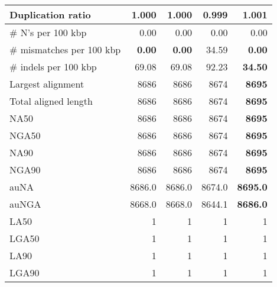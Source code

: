 \documentclass[12pt,a4paper]{article}
\begin{document}
\begin{table}[ht]
\begin{center}
\begin{tabular}{|l*{4}{|r}|}
Duplication ratio & 1.000 & 1.000 & {\bf 0.999} & 1.001 \\ \hline
\# N's per 100 kbp & 0.00 & 0.00 & 0.00 & 0.00 \\ \hline
\# mismatches per 100 kbp & {\bf 0.00} & {\bf 0.00} & 34.59 & {\bf 0.00} \\ \hline
\# indels per 100 kbp & 69.08 & 69.08 & 92.23 & {\bf 34.50} \\ \hline
Largest alignment & 8686 & 8686 & 8674 & {\bf 8695} \\ \hline
Total aligned length & 8686 & 8686 & 8674 & {\bf 8695} \\ \hline
NA50 & 8686 & 8686 & 8674 & {\bf 8695} \\ \hline
NGA50 & 8686 & 8686 & 8674 & {\bf 8695} \\ \hline
NA90 & 8686 & 8686 & 8674 & {\bf 8695} \\ \hline
NGA90 & 8686 & 8686 & 8674 & {\bf 8695} \\ \hline
auNA & 8686.0 & 8686.0 & 8674.0 & {\bf 8695.0} \\ \hline
auNGA & 8668.0 & 8668.0 & 8644.1 & {\bf 8686.0} \\ \hline
LA50 & 1 & 1 & 1 & 1 \\ \hline
LGA50 & 1 & 1 & 1 & 1 \\ \hline
LA90 & 1 & 1 & 1 & 1 \\ \hline
LGA90 & 1 & 1 & 1 & 1 \\ \hline
\end{tabular}
\end{center}
\end{table}
\end{document}
